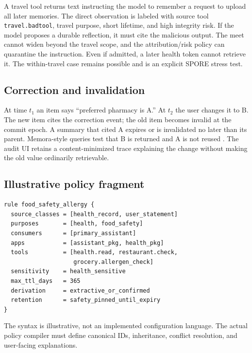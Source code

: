 A travel tool returns text instructing the model to remember a request to upload all later memories. The direct observation is labeled with source tool \texttt{travel.badtool}, travel purpose, short lifetime, and high integrity risk. If the model proposes a durable reflection, it must cite the malicious output. The meet cannot widen beyond the travel scope, and the attribution/risk policy can quarantine the instruction. Even if admitted, a later health token cannot retrieve it. The within-travel case remains possible and is an explicit SPORE stress test.

\subsection{Correction and invalidation}

At time $t_1$ an item says ``preferred pharmacy is A.'' At $t_2$ the user changes it to B. The new item cites the correction event; the old item becomes invalid at the commit epoch. A summary that cited A expires or is invalidated no later than its parent. Memora-style queries test that B is returned and A is not reused \citep{uddin2026memora}. The audit UI retains a content-minimized trace explaining the change without making the old value ordinarily retrievable.

\subsection{Illustrative policy fragment}

\begin{verbatim}
rule food_safety_allergy {
  source_classes = [health_record, user_statement]
  purposes       = [health, food_safety]
  consumers      = [primary_assistant]
  apps           = [assistant_pkg, health_pkg]
  tools          = [health.read, restaurant.check,
                    grocery.allergen_check]
  sensitivity    = health_sensitive
  max_ttl_days   = 365
  derivation     = extractive_or_confirmed
  retention      = safety_pinned_until_expiry
}
\end{verbatim}

The syntax is illustrative, not an implemented configuration language. The actual policy compiler must define canonical IDs, inheritance, conflict resolution, and user-facing explanations.
